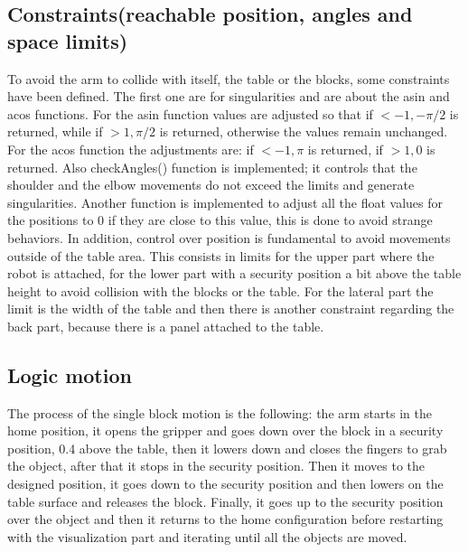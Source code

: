 \documentclass[12pt,a4paper]{article}
\begin{document}
\subsection{Constraints(reachable position, angles and space limits)}\label{subsec:constraints}
To avoid the arm to collide with itself, the table or the blocks, some constraints have been defined. The first one are for singularities and are about the asin and acos functions. For the asin function values are adjusted so that if $<-1, -\pi/2$ is returned, while if $>1, \pi/2$ is returned, otherwise the values remain unchanged. For the acos function the adjustments are: if $<-1, \pi$ is returned, if $>1, 0$ is returned. Also checkAngles() function is implemented; it controls that the shoulder and the elbow movements do not exceed the limits and generate singularities. Another function is implemented to adjust all the float values for the positions to 0 if they are close to this value, this is done to avoid strange behaviors. In addition, control over position is fundamental to avoid movements outside of the table area. This consists in limits for the upper part where the robot is attached, for the lower part with a security position a bit above the table height to avoid collision with the blocks or the table. For the lateral part the limit is the width of the table and then there is another constraint regarding the back part, because there is a panel attached to the table.

\subsection{Logic motion}\label{subsec:logic}
The process of the single block motion is the following: the arm starts in the home position, it opens the gripper and goes down over the block in a security position, 0.4 above the table, then it lowers down and closes the fingers to grab the object, after that it stops in the security position. Then it moves to the designed position, it goes down to the security position and then lowers on the table surface and releases the block. Finally, it goes up to the security position over the object and then it returns to the home configuration before restarting with the visualization part and iterating until all the objects are moved.

\end{document}
